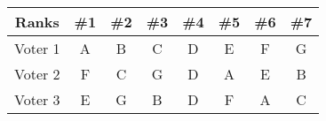 \documentclass{article}
\begin{document}



\begin{center}
\begin{tabular}{|c|c c c c c c c|}
  \hline
  Ranks & \#1 & \#2 & \#3 & \#4 & \#5 & \#6 & \#7 \\ \hline
  Voter 1 & A & B & C & D & E & F & G \\ \hline
  Voter 2 & F & C & G & D & A & E & B \\ \hline
  Voter 3 & E & G & B & D & F & A & C \\ \hline
\end{tabular}
\end{center}
\end{document}
